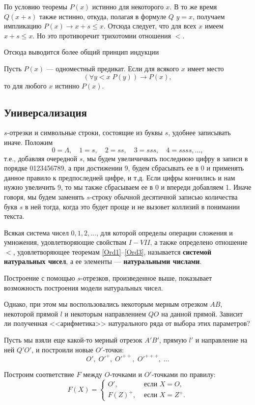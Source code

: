 По условию теоремы $P(x)$ истинно для некоторого $x$. В то же время $Q(x+s)$ также истинно, откуда, полагая в формуле $Q$ $y=x$, получаем импликацию $P(x)\to x+s\le x$. Отсюда следует, что для всех $x$ имеем $x+s\le x$. Но это противоречит трихотомии отношения $<$.
\epf

Отсюда выводится более общий принцип индукции
\begin{thrm} Пусть $P(x)$ --- одноместный предикат. Если для всякого $x$ имеет место
$$
(\forall y<x\;P(y))\to P(x),
$$
то для любого $x$ истинно $P(x)$.
\end{thrm}



\subsection{Универсализация}


$s$-отрезки и символьные строки, состоящие из буквы $s$, удобнее записывать иначе. Положим
$$
0=\Lambda,\quad 1=s,\quad 2=ss,\quad 3=sss,\quad 4=ssss,\dots,
$$
т.е., добавляя очередной $s$, мы будем увеличичвать последнюю цифру в записи в порядке 0123456789, а при достижении 9, будем сбрасывать ее в 0 и применять данное правило к предпоследней цифре, и т.д. Если цифры кончились и нам нужно увеличить 9, то мы также сбрасываем ее в 0 и впереди добавляем 1. Иначе говоря, мы будем заменять $s$-строку обычной десятичной записью количества букв $s$ в ней тогда, когда это будет проще и не вызовет коллизий в понимании текста.

Всякая система чисел $0,1,2,\dots$, для которой определы операции сложения и умножения, удовлетворяющие свойствам $I-VII$, а также определено отношение $<$, удовлетворяющее теоремам \ref{Ord1}--\ref{Ord3}, называется \textbf{системой натуральных чисел}, а ее элементы --- \textbf{натуральными числами}.

Построение с помощью $s$-отрезков, произведенное выше, показывает возможность построения модели натуральных чисел.

Однако, при этом мы воспользовались некоторым мерным отрезком $AB$, некоторой прямой $l$ и некоторым направлением $QO$ на данной прямой. Зависит ли полученная <<арифметика>> натурального ряда от выбора этих параметров?

Пусть мы взяли еще какой-то мерный отрезок $A'B'$, прямую $l'$ и направление на ней $Q'O'$, и построили новые $O'$-точки:
$$
O',\;O'^+,\;O'^{++},\;O'^{+++},\;\dots
$$

Построим соответствие $F$ между $O$-точками и $O'$-точками по правилу:
$$
F(X)=\begin{cases}
O', & \mbox{ если }X=O,\\
F(Z)^+, & \mbox{ если }X=Z^+.
\end{cases}
$$

